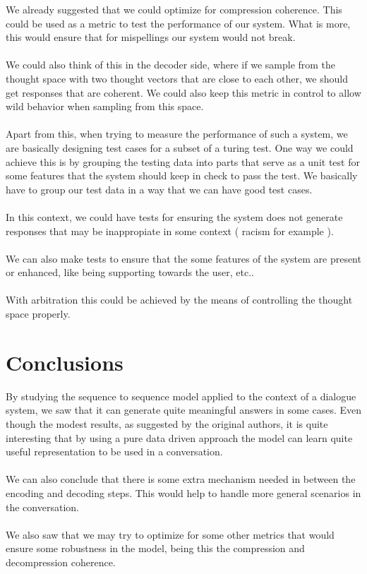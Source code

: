 \documentclass{llncs}
\begin{document}
We already suggested that we could optimize for compression coherence. This could be used as a metric to test the performance of our system. What is more, this would ensure that for mispellings our system would not break.
\\
\\
We could also think of this in the decoder side, where if we sample from the thought space with two thought vectors that are close to each other, we should get responses that are coherent. We could also keep this metric in control to allow wild behavior when sampling from this space.
\\
\\
Apart from this, when trying to measure the performance of such a system, we are basically designing test cases for a subset of a turing test. One way we could achieve this is by grouping the testing data into parts that serve as a unit test for some features that the system should keep in check to pass the test. We basically have to group our test data in a way that we can have good test cases.
\\
\\
In this context, we could have tests for ensuring the system does not generate responses that may be inappropiate in some context ( racism for example ).
\\
\\
We can also make tests to ensure that the some features of the system are present or enhanced, like being supporting towards the user, etc..
\\
\\
With arbitration this could be achieved by the means of controlling the thought space properly. 

\section{Conclusions}

By studying the sequence to sequence model applied to the context of a dialogue system, we saw that it can generate quite meaningful answers in some cases. Even though the modest results, as suggested by the original authors, it is quite interesting that by using a pure data driven approach the model can learn quite useful representation to be used in a conversation. 
\\
\\
We can also conclude that there is some extra mechanism needed in between the encoding and decoding steps. This would help to handle more general scenarios in the conversation. 
\\
\\
We also saw that we may try to optimize for some other metrics that would ensure some robustness in the model, being this the compression and decompression coherence.
\end{document}
